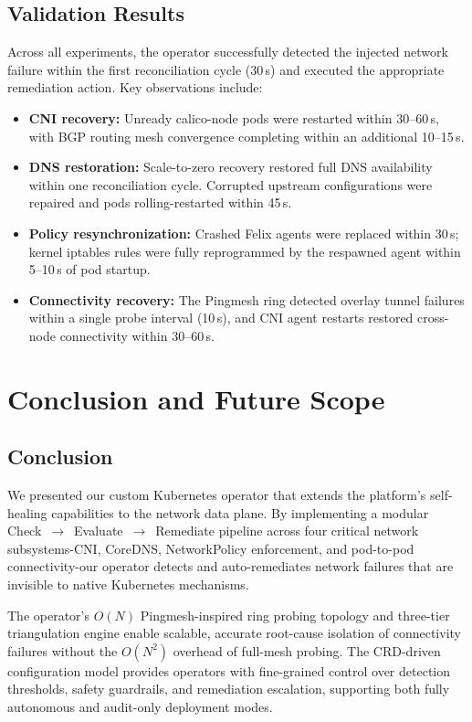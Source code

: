\documentclass[conference]{IEEEtran}
\begin{document}
\subsection{Validation Results}
Across all experiments, the operator successfully detected the injected network failure within the first reconciliation cycle (30\,s) and executed the appropriate remediation action. Key observations include:
\begin{itemize}
  \item \textbf{CNI recovery:} Unready calico-node pods were restarted within 30--60\,s, with BGP routing mesh convergence completing within an additional 10--15\,s.
  \item \textbf{DNS restoration:} Scale-to-zero recovery restored full DNS availability within one reconciliation cycle. Corrupted upstream configurations were repaired and pods rolling-restarted within 45\,s.
  \item \textbf{Policy resynchronization:} Crashed Felix agents were replaced within 30\,s; kernel iptables rules were fully reprogrammed by the respawned agent within 5--10\,s of pod startup.
  \item \textbf{Connectivity recovery:} The Pingmesh ring detected overlay tunnel failures within a single probe interval (10\,s), and CNI agent restarts restored cross-node connectivity within 30--60\,s.
\end{itemize}


\section{Conclusion and Future Scope}

\subsection{Conclusion}
We presented our custom Kubernetes operator that extends the platform's self-healing capabilities to the network data plane. By implementing a modular Check~$\to$~Evaluate~$\to$~Remediate pipeline across four critical network subsystems-CNI, CoreDNS, NetworkPolicy enforcement, and pod-to-pod connectivity-our operator detects and auto-remediates network failures that are invisible to native Kubernetes mechanisms.

The operator's $O(N)$ Pingmesh-inspired ring probing topology and three-tier triangulation engine enable scalable, accurate root-cause isolation of connectivity failures without the $O(N^2)$ overhead of full-mesh probing. The CRD-driven configuration model provides operators with fine-grained control over detection thresholds, safety guardrails, and remediation escalation, supporting both fully autonomous and audit-only deployment modes.
\end{document}

